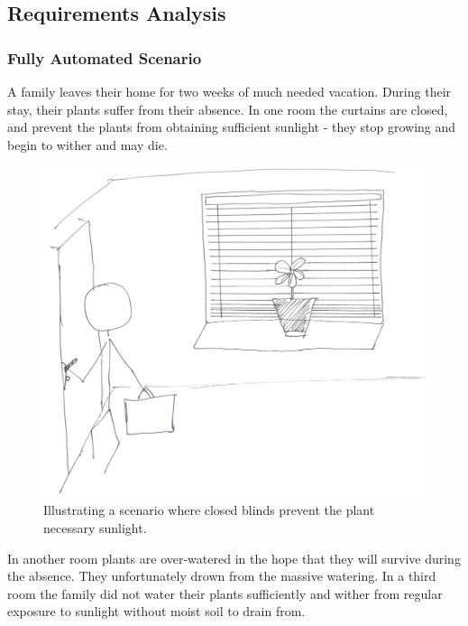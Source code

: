 \documentclass{ubicomp2012}
\begin{document}
\subsection{Requirements Analysis}

\subsubsection{Fully Automated Scenario}
A family leaves their home for two weeks of much needed vacation. During their stay, their plants suffer from their absence.
In one room the curtains are closed, and prevent the plants from obtaining sufficient sunlight - they stop growing and begin to wither and may die.

\begin{figure}[h!]
\centering
\includegraphics[width=\columnwidth]{closed_blinds.png}
\caption{Illustrating a scenario where closed blinds prevent the plant necessary sunlight.}
\label{fig:closed_blinds}
\end{figure}

In another room plants are over-watered in the hope that they will survive during the absence. They unfortunately drown from the massive watering.
In a third room the family did not water their plants sufficiently and wither from regular exposure to sunlight without moist soil to drain from.
\end{document}

